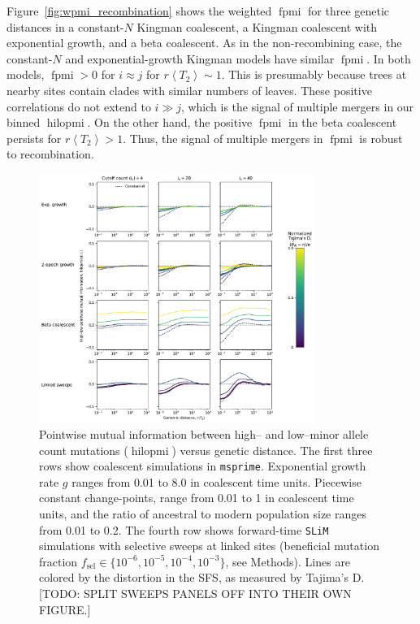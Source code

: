 \documentclass[11pt, letterpaper]{article}   	%
\newcommand{\Fig}[1]{Figure~\ref{#1}}
\newcommand{\E}[1]{\left< #1 \right>}
\DeclareMathOperator{\fpmi}{fpmi}
\DeclareMathOperator{\hilopmi}{hilopmi}
\begin{document}
\Fig{fig:wpmi_recombination} shows the weighted $\fpmi$ for three genetic distances in a constant-$N$ Kingman coalescent, a Kingman coalescent with exponential growth, and a beta coalescent.
As in the non-recombining case, the constant-$N$ and exponential-growth Kingman models have similar $\fpmi$.
In both models, $\fpmi > 0$ for $i\approx j$ for $r\E{T_2} \sim 1$.
This is presumably because trees at nearby sites contain clades with similar numbers of leaves.
These positive correlations do not extend to $i \gg j$, which is the signal of multiple mergers in our binned $\hilopmi$.
On the other hand, the positive $\fpmi$ in the beta coalescent persists for $r\E{T_2} > 1$.
Thus, the signal of multiple mergers in $\fpmi$ is robust to recombination.

\begin{figure}
\centering
\includegraphics[width=0.8\textwidth]{figures/figure5.pdf}
\caption{Pointwise mutual information between high-- and low--minor allele count mutations ($\hilopmi$) versus genetic distance. The first three rows show coalescent simulations in \texttt{msprime}. Exponential growth rate $g$ ranges from 0.01 to 8.0 in coalescent time units. Piecewise constant change-points, range from 0.01 to 1 in coalescent time units, and the ratio of ancestral to modern population size ranges from 0.01 to 0.2. The fourth row shows forward-time \texttt{SLiM} simulations with selective sweeps at linked sites (beneficial mutation fraction $f_{\text{sel}} \in \{10^{-6}, 10^{-5}, 10^{-4}, 10^{-3}\}$, see Methods). Lines are colored by the distortion in the SFS, as measured by Tajima's D. [TODO: SPLIT SWEEPS PANELS OFF INTO THEIR OWN FIGURE.]\label{fig:hilo_vs_d}}
\end{figure}
\end{document}
